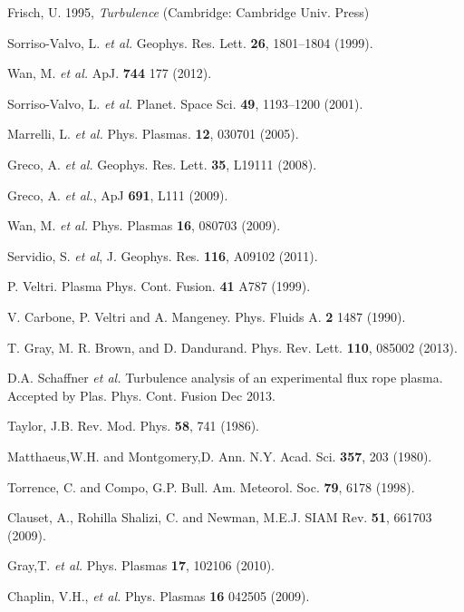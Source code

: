 \documentclass[aps,prl,amsmath,amssymb,reprint,superscriptaddress]{revtex4-1} %
\begin{document}
\providecommand{\noopsort}[1]{}\providecommand{\singleletter}[1]{#1}%
\begin{thebibliography}{99}

Frisch, U. 1995, {\it Turbulence} (Cambridge: Cambridge Univ. Press)

Sorriso-Valvo, L. {\it et al.} Geophys. Res. Lett. {\bf 26}, 1801–1804 (1999).

Wan, M. {\it et al.} ApJ. {\bf 744} 177 (2012).

Sorriso-Valvo, L. {\it et al.} Planet. Space Sci. {\bf 49}, 1193–1200 (2001).

Marrelli, L. {\it et al.} Phys. Plasmas. {\bf 12}, 030701 (2005).

Greco, A. {\it et al.} Geophys. Res. Lett. {\bf 35}, L19111 (2008).

Greco, A. {\it et al.}, ApJ {\bf 691}, L111 (2009).

Wan, M. {\it et al.} Phys. Plasmas {\bf 16}, 080703 (2009).

Servidio, S. {\it et al}, J. Geophys. Res. {\bf 116}, A09102 (2011).

P. Veltri. Plasma Phys. Cont. Fusion. {\bf 41} A787 (1999).

V. Carbone, P. Veltri and A. Mangeney. Phys. Fluids A. {\bf 2} 1487 (1990).

T. Gray, M. R. Brown, and D. Dandurand. Phys. Rev. Lett. {\bf 110}, 085002 (2013). 

D.A. Schaffner {\it et al.} Turbulence analysis of an experimental flux rope plasma. Accepted by Plas. Phys. Cont. Fusion Dec 2013.

Taylor, J.B. Rev. Mod. Phys. {\bf 58}, 741 (1986).

Matthaeus,W.H. and Montgomery,D. Ann. N.Y. Acad. Sci. {\bf 357}, 203 (1980).

Torrence, C. and Compo, G.P. Bull. Am. Meteorol. Soc. {\bf 79}, 6178 (1998).

Clauset, A., Rohilla Shalizi, C. and Newman, M.E.J. SIAM Rev. {\bf 51}, 661703 (2009).

Gray,T. {\it et al.} Phys. Plasmas {\bf 17}, 102106 (2010).

Chaplin, V.H., {\it et al.} Phys. Plasmas {\bf 16} 042505 (2009).


\end{thebibliography}
\end{document}
